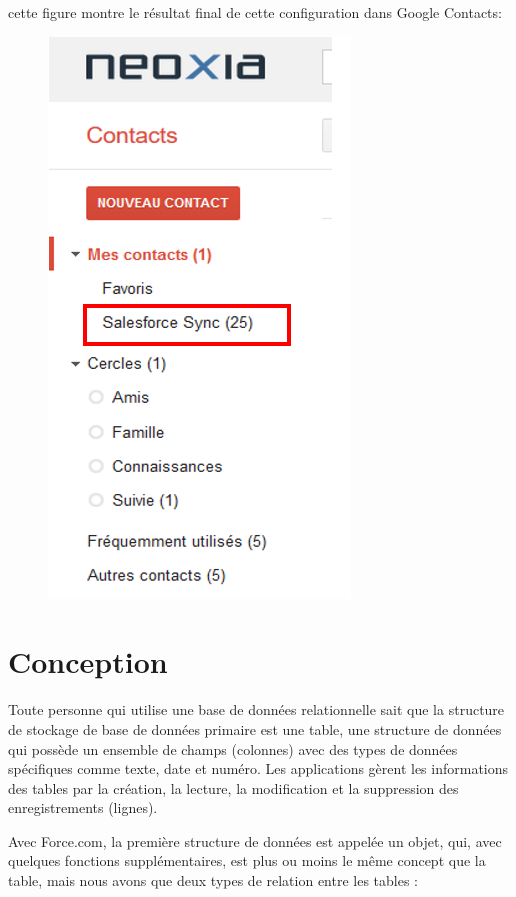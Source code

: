 \documentclass[a4paper, 12pt]{report}
\begin{document}
\begin{itemize}
\begin{enumerate}
cette figure montre le résultat final de cette configuration dans Google Contacts:
\begin{figure}[H]
	\centering
		\includegraphics{Contactsync.PNG}
	\label{fig:les Contacts Synchronisés de SF vers Google Contacts}
\end{figure}
 




\end{enumerate}

\section{Conception}
Toute personne qui utilise une base de données relationnelle sait que la structure de stockage de base de données primaire est une table, une structure de données qui possède un ensemble de champs (colonnes) avec des types de données spécifiques comme texte, date et numéro. Les applications gèrent les informations des tables par la création, la lecture, la modification et la suppression des enregistrements (lignes).

Avec Force.com, la première structure de données est appelée un objet, qui, avec quelques fonctions supplémentaires, est plus ou moins le même concept que la table, mais nous avons que deux types de relation entre les tables :
	

\end{itemize}
\end{document}

